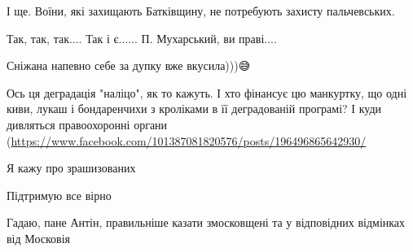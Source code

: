 \begin{itemize}
І ще. Воїни, які захищають Батківщину, не потребують захисту пальчевських.

 
Так, так, так....
Так і є......
П. Мухарський, ви праві....

 
Сніжана напевно себе за дупку вже вкусила)))😅

 

Ось ця деградація "наліцо", як то кажуть. І хто фінансує цю манкуртку, що одні
киви, лукаш і бондаренчихи з кроліками в її деградованій програмі? І куди
дивляться правоохоронні органи
(\url{https://www.facebook.com/101387081820576/posts/196496865642930/}


 
Я кажу про зрашизованих

 
Підтримую все вірно

 
Гадаю, пане Антін, правильніше казати змосковщені та у відповідних відмінках від Московія \Laughey[1.0][white]


\end{itemize}
